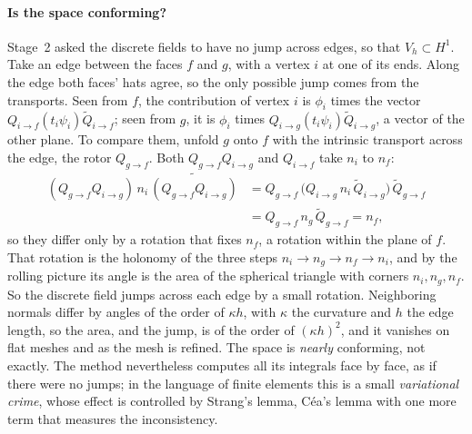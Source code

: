 \paragraph{Is the space conforming?} Stage~2 asked the discrete fields to have no jump across edges, so that $V_h\subset H^1$. Take an edge between the faces $f$ and $g$, with a vertex $i$ at one of its ends. Along the edge both faces' hats agree, so the only possible jump comes from the transports. Seen from $f$, the contribution of vertex $i$ is $\phi_i$ times the vector $Q_{i\to f}(t_i\psi_i)\widetilde Q_{i\to f}$; seen from $g$, it is $\phi_i$ times $Q_{i\to g}(t_i\psi_i)\widetilde Q_{i\to g}$, a vector of the other plane. To compare them, unfold $g$ onto $f$ with the intrinsic transport across the edge, the rotor $Q_{g\to f}$. Both $Q_{g\to f}Q_{i\to g}$ and $Q_{i\to f}$ take $n_i$ to $n_f$:
\begin{equation*}
\begin{aligned}
(Q_{g\to f}Q_{i\to g})\, n_i\, \widetilde{(Q_{g\to f}Q_{i\to g})} &= Q_{g\to f}\,\big(Q_{i\to g}\, n_i\,\widetilde Q_{i\to g}\big)\,\widetilde Q_{g\to f} \\
&= Q_{g\to f}\, n_g\,\widetilde Q_{g\to f} = n_f ,
\end{aligned}
\end{equation*}
so they differ only by a rotation that fixes $n_f$, a rotation within the plane of $f$. That rotation is the holonomy of the three steps $n_i\to n_g\to n_f\to n_i$, and by the rolling picture its angle is the area of the spherical triangle with corners $n_i, n_g, n_f$. So the discrete field jumps across each edge by a small rotation. Neighboring normals differ by angles of the order of $\kappa h$, with $\kappa$ the curvature and $h$ the edge length, so the area, and the jump, is of the order of $(\kappa h)^2$, and it vanishes on flat meshes and as the mesh is refined. The space is \emph{nearly} conforming, not exactly. The method nevertheless computes all its integrals face by face, as if there were no jumps; in the language of finite elements this is a small \emph{variational crime}, whose effect is controlled by Strang's lemma, C\'ea's lemma with one more term that measures the inconsistency.


